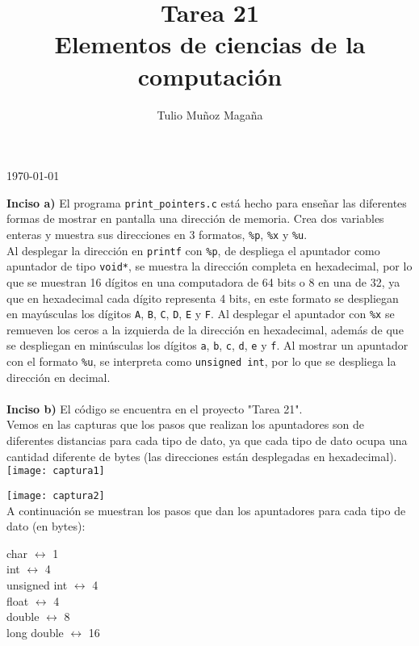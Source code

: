 \documentclass[12pt]{article}
\begin{document}
\title{Tarea 21\\
	\large Elementos de ciencias de la computación}

\author{Tulio Muñoz Magaña}
\today
\maketitle

\textbf{Inciso a)} El programa \texttt{print\_pointers.c} está hecho para enseñar las diferentes formas de mostrar en pantalla una dirección de memoria. Crea dos variables enteras y muestra sus direcciones en 3 formatos, \texttt{\%p}, \texttt{\%x} y \texttt{\%u}.\\
Al desplegar la dirección en \texttt{printf} con \texttt{\%p}, de despliega el apuntador como apuntador de tipo \texttt{void*}, se muestra la dirección completa en hexadecimal, por lo que se muestran 16 dígitos en una computadora de 64 bits o 8 en una de 32, ya que en hexadecimal cada dígito representa 4 bits, en este formato se despliegan en mayúsculas los dígitos \texttt{A}, \texttt{B}, \texttt{C}, \texttt{D}, \texttt{E} y \texttt{F}. Al desplegar el apuntador con \texttt{\%x} se remueven los ceros a la izquierda de la dirección en hexadecimal, además de que se despliegan en minúsculas los dígitos \texttt{a}, \texttt{b}, \texttt{c}, \texttt{d}, \texttt{e} y \texttt{f}. Al mostrar un apuntador con el formato \texttt{\%u}, se interpreta como \texttt{unsigned int}, por lo que se despliega la dirección en decimal.\\\\

\textbf{Inciso b)} El código se encuentra en el proyecto "Tarea 21".\\

Vemos en las capturas que los pasos que realizan los apuntadores son de diferentes distancias para cada tipo de dato, ya que cada tipo de dato ocupa una cantidad diferente de bytes (las direcciones están desplegadas en hexadecimal).\\

\texttt{[image: captura1]}




\texttt{[image: captura2]}\\

A continuación se muestran los pasos que dan los apuntadores para cada tipo de dato (en bytes):\\

{\setlength\parindent{0pt}

char $\leftrightarrow$ 1\\
int $\leftrightarrow$ 4\\
unsigned int $\leftrightarrow$ 4\\
float $\leftrightarrow$ 4\\
double $\leftrightarrow$ 8\\
long double $\leftrightarrow$ 16\\


}
\end{document}
